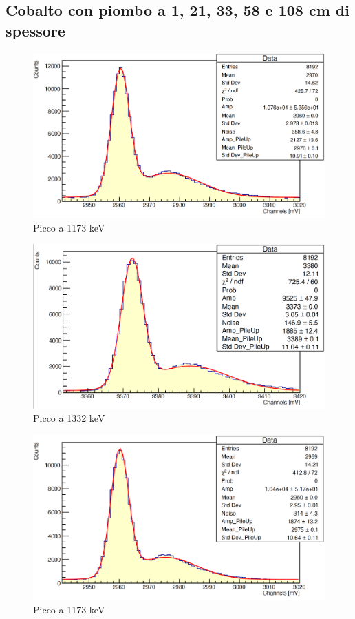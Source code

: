 \documentclass[a4paper,10pt]{article}
\begin{document}
\subsection{Cobalto con piombo a 1, 21, 33, 58 e 108 cm di spessore}
\begin{figure}[H]
    \centering
    \includegraphics[scale=0.45]{appendice/spettri/CoPb1_1}
    \caption{Picco a 1173 keV}
\end{figure}
\begin{figure}[H]
    \centering
    \includegraphics[scale=0.45]{appendice/spettri/CoPb2_1}
    \caption{Picco a 1332 keV}
\end{figure}
\begin{figure}[H]
    \centering
    \includegraphics[scale=0.45]{appendice/spettri/CoPb1_21}
    \caption{Picco a 1173 keV}
\end{figure}
\end{document}
